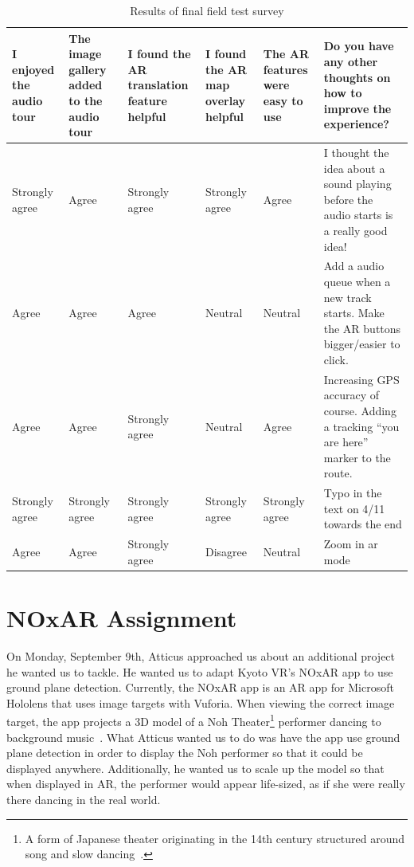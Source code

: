 \documentclass[a4paper, 10pt, american, titlepage]{article}
\begin{document}
\begin{table}[h]
\begin{singlespace}
\renewcommand{\arraystretch}{2.0} %
\footnotesize %
\begin{tabulary}{\textwidth}{ L | L | L | L | L | L }
	I enjoyed the audio tour & The image gallery added to the audio tour & I
	found the AR translation feature helpful & I found the AR map overlay
	helpful & The AR features were easy to use & Do you have any other thoughts
	on how to improve the experience? \\
	\hline

	Strongly agree & Agree & Strongly agree & Strongly agree & Agree & I thought
	the idea about a sound playing before the audio starts is a really good
	idea! \\

	Agree & Agree & Agree & Neutral & Neutral & Add a audio queue when a new
	track starts. Make the AR buttons bigger/easier to click. \\

	Agree & Agree & Strongly agree & Neutral & Agree & Increasing GPS accuracy
	of course. Adding a tracking ``you are here'' marker to the route. \\

	Strongly agree & Strongly agree & Strongly agree & Strongly agree & Strongly
	agree & Typo in the text on 4/11 towards the end \\

	Agree & Agree & Strongly agree & Disagree & Neutral & Zoom in ar mode \\
\end{tabulary}
\end{singlespace}
\caption{Results of final field test survey}
\label{tab:testingSurveyResults}
\end{table}

\section{NOxAR Assignment}
\label{sec:NOxAR}

On Monday, September 9th, Atticus approached us about an additional project he 
wanted us to tackle. He wanted us to adapt Kyoto VR's NOxAR app to use ground
plane detection. Currently, the NOxAR app is an AR app for Microsoft Hololens
that uses image targets with Vuforia. When viewing the correct image target,
the app projects a 3D model of a Noh Theater\footnote{A form of Japanese 
theater originating in the 14th century structured around song and slow 
dancing~\autocite{japanguide2018}.} performer dancing to background 
music~\autocite{noxar2018}. What Atticus wanted us to do was have the app use 
ground plane detection in order to display the Noh performer so that it could 
be displayed anywhere. Additionally, he wanted us to scale up the model so that
when displayed in AR, the performer would appear life-sized, as if she were 
really there dancing in the real world. 
\end{document}
